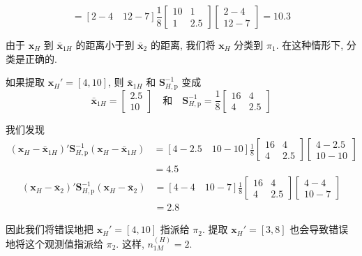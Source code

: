 
\[
=[2-4\quad 12-7]\frac{1}{8}\begin{bmatrix}10&1\\1&2.5\end{bmatrix}\begin{bmatrix}2-4\\12-7\end{bmatrix}=10.3
\]

由于 $\mathbf{x}_H$ 到 $\bar{\mathbf{x}}_{1H}$ 的距离小于到 $\bar{\mathbf{x}}_2$ 的距离, 我们将 $\mathbf{x}_H$ 分类到 $\pi_1$. 在这种情形下, 分类是正确的.

如果提取 $\mathbf{x}_H'=[4,10]$, 则 $\bar{\mathbf{x}}_{1H}$ 和 $\mathbf{S}_{H,\mathrm{p}}^{-1}$ 变成
\[
\bar{\mathbf{x}}_{1H}=\begin{bmatrix}2.5\\10\end{bmatrix}\quad \text{和}\quad \mathbf{S}_{H,\mathrm{p}}^{-1}=\frac{1}{8}\begin{bmatrix}16&4\\4&2.5\end{bmatrix}
\]

我们发现
\[
\begin{aligned}
(\mathbf{x}_H-\bar{\mathbf{x}}_{1H})'\mathbf{S}_{H,\mathrm{p}}^{-1}(\mathbf{x}_H-\bar{\mathbf{x}}_{1H})&=[4-2.5\quad 10-10]\frac{1}{8}\begin{bmatrix}16&4\\4&2.5\end{bmatrix}\begin{bmatrix}4-2.5\\10-10\end{bmatrix}\\
&=4.5
\end{aligned}
\]
\[
\begin{aligned}
(\mathbf{x}_H-\bar{\mathbf{x}}_2)'\mathbf{S}_{H,\mathrm{p}}^{-1}(\mathbf{x}_H-\bar{\mathbf{x}}_2)&=[4-4\quad 10-7]\frac{1}{8}\begin{bmatrix}16&4\\4&2.5\end{bmatrix}\begin{bmatrix}4-4\\10-7\end{bmatrix}\\
&=2.8
\end{aligned}
\]

因此我们将错误地把 $\mathbf{x}_H'=[4,10]$ 指派给 $\pi_2$. 提取 $\mathbf{x}_H'=[3,8]$ 也会导致错误地将这个观测值指派给 $\pi_2$. 这样, $n_{1M}^{(H)}=2$.


